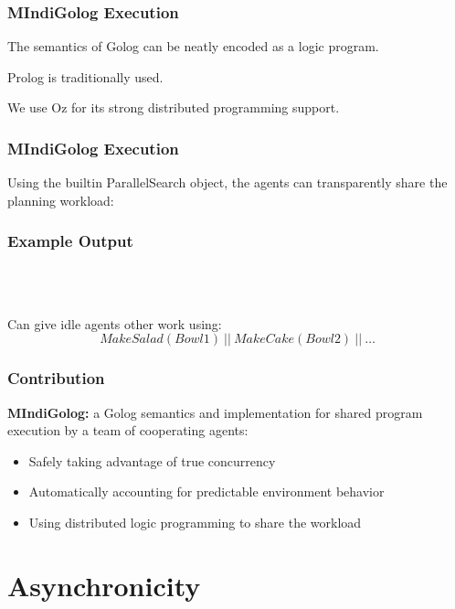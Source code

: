 \documentclass{beamer}
\begin{document}
\begin{frame}
\frametitle{MIndiGolog Execution}
The semantics of Golog can be neatly encoded as a logic program.

Prolog is traditionally used.

We use Oz for its strong distributed programming support.


\end{frame}

\begin{frame}
\frametitle{MIndiGolog Execution}
Using the builtin ParallelSearch object, the agents can transparently
share the planning workload:


\end{frame}

\begin{frame}
\frametitle{Example Output}
\begin{columns}
  \begin{column}{0.5\textwidth}
  \end{column}
  \begin{column}{0.5\textwidth}
  \end{column}
\end{columns}
\ \\
\ \\
\pause
Can give idle agents other work using:\[
MakeSalad(Bowl1)\ ||\ MakeCake(Bowl2)\ ||\ \dots\]
\end{frame}

\begin{frame}
\frametitle{Contribution}
\textbf{MIndiGolog:} a Golog semantics and implementation for shared program 
 execution by a team  of cooperating agents:
\begin{itemize}
\item Safely taking advantage of true concurrency
\item Automatically accounting for predictable environment behavior
\item Using distributed logic programming to share the workload
\end{itemize}
\end{frame}

\section{Asynchronicity}
\end{document}
